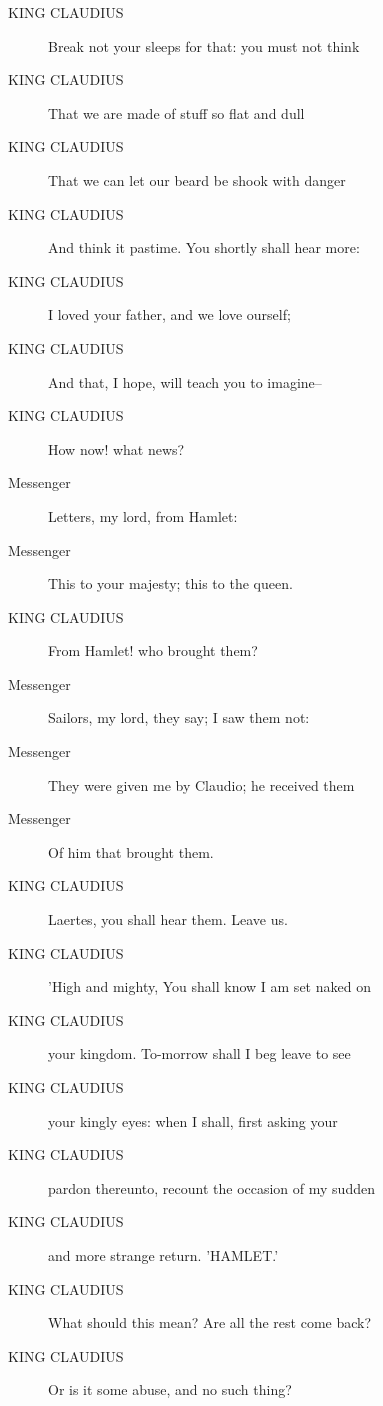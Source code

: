\documentclass{article}
\begin{document}
\begin{description}
            
\item[KING CLAUDIUS] Break not your sleeps for that: you must not think
\item[KING CLAUDIUS] That we are made of stuff so flat and dull
\item[KING CLAUDIUS] That we can let our beard be shook with danger
\item[KING CLAUDIUS] And think it pastime. You shortly shall hear more:
\item[KING CLAUDIUS] I loved your father, and we love ourself;
\item[KING CLAUDIUS] And that, I hope, will teach you to imagine--
\item[KING CLAUDIUS] How now! what news?
\end{description}
          
\begin{description}
            
\item[Messenger] Letters, my lord, from Hamlet:
\item[Messenger] This to your majesty; this to the queen.
\end{description}
          
\begin{description}
            
\item[KING CLAUDIUS] From Hamlet! who brought them?
\end{description}
          
\begin{description}
            
\item[Messenger] Sailors, my lord, they say; I saw them not:
\item[Messenger] They were given me by Claudio; he received them
\item[Messenger] Of him that brought them.
\end{description}
          
\begin{description}
            
\item[KING CLAUDIUS] Laertes, you shall hear them. Leave us.
\item[KING CLAUDIUS] 'High and mighty, You shall know I am set naked on
\item[KING CLAUDIUS] your kingdom. To-morrow shall I beg leave to see
\item[KING CLAUDIUS] your kingly eyes: when I shall, first asking your
\item[KING CLAUDIUS] pardon thereunto, recount the occasion of my sudden
\item[KING CLAUDIUS] and more strange return.                  'HAMLET.'
\item[KING CLAUDIUS] What should this mean? Are all the rest come back?
\item[KING CLAUDIUS] Or is it some abuse, and no such thing?
\end{description}
          
\end{document}
